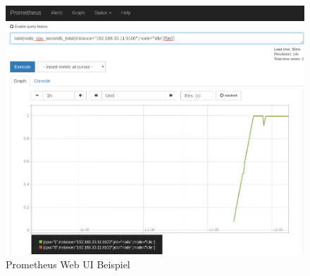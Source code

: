 \documentclass[titlepage]{report}
\begin{document}
\begin{figure}[H]
    \centering
    \includegraphics[width=1.0\textwidth]{figures/prometheus_web_ui.png}
    \caption{Prometheus Web UI Beispiel}\label{fig:prometheuswebui}
\end{figure}
\end{document}
